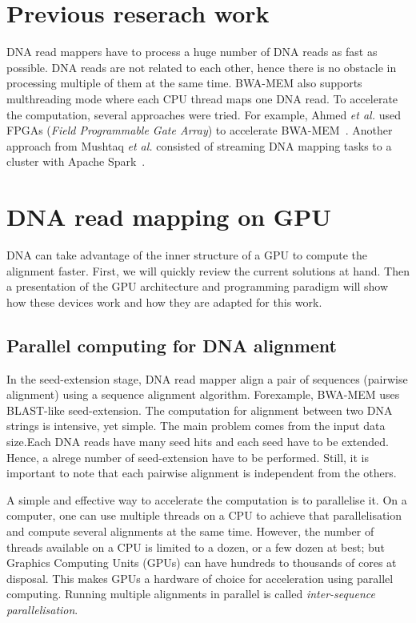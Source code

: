 \section{Previous reserach work}
DNA read mappers have to process a huge number of DNA reads as fast as possible. DNA reads are not related to each other, hence there is no obstacle in processing multiple of them at the same time. BWA-MEM also supports multhreading mode where each CPU thread maps one DNA read.
To accelerate the computation, several approaches were tried. For example, Ahmed \emph{et al.} used  FPGAs (\emph{Field Programmable Gate Array}) to accelerate BWA-MEM~\cite{Ahmed:FPGA}. Another approach from Mushtaq \emph{et al.} consisted of streaming DNA mapping tasks to a cluster with Apache Spark~\cite{Mushtaq:spark}.

\section{DNA read mapping on GPU}

DNA  can take advantage of the inner structure of a GPU to compute the alignment faster. First, we will quickly review the current solutions at hand. Then a presentation of the GPU architecture and programming paradigm will show how these devices work and how they are adapted for this work.

\subsection{Parallel computing for DNA alignment}
In the seed-extension stage, DNA read mapper align a pair of sequences (pairwise alignment) using a sequence alignment algorithm. Forexample, BWA-MEM uses BLAST-like seed-extension.
The computation for alignment between two DNA strings is intensive, yet simple. The main problem comes from the input data size.Each DNA reads have many seed hits and each seed have to be extended. Hence, a alrege number of seed-extension have to be performed. Still, it is important to note that each pairwise alignment is independent from the others. 



A simple and effective way to accelerate the computation is to parallelise it. On a computer, one can use multiple threads on a CPU to achieve that parallelisation and compute several alignments at the same time. However, the number of threads available on a CPU is limited to a dozen, or a few dozen at best; but Graphics Computing Units (GPUs) can have hundreds to thousands of cores at disposal. This makes GPUs a hardware of choice for acceleration using parallel computing. Running multiple alignments in parallel is called \emph{inter-sequence parallelisation}. 

